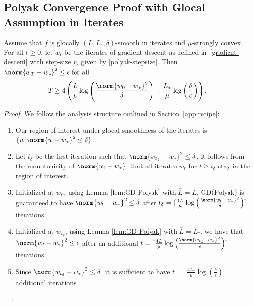 \documentclass[10pt]{article} %
\begin{document}
\subsection{Polyak Convergence Proof with Glocal Assumption in Iterates}
\label{polyak-proofs-iterates}
\begin{theorem}
    \label{polyak-theorem-iterates}
    Assume that $f$ is glocally $(L, L_*, \delta)$-smooth in iterates and $\mu$-strongly convex. For all $t \geq 0$, let $w_t$ be the iterates of gradient descent as defined in~\eqref{gradient-descent} with step-size $\eta_t$ given by \eqref{polyak-stepsize}. Then $\norm{w_T - w_*}^2 \leq \epsilon \;\text{for all}$
    \begin{equation*}        
         T \geq 
         4\left(\frac{L}{\mu}\log\left(\frac{\norm{w_0 - w_*}^2}{\delta}\right) + \frac{L_*}{\mu}\log\left(\frac{\delta}{\epsilon}\right)\right).      
    \end{equation*}
\end{theorem}
\begin{proof}
We follow the analysis structure outlined in Section~\ref{app:recipe}:
    \begin{enumerate}
    \item Our region of interest under glocal smoothness of the iterates is $\{w | \norm{w - w_*}^2 \leq \delta \}$.
    \item Let $t_\delta$ be the first iteration such that $\norm{w_{t_\delta} - w_*}^2 \leq \delta$. It follows from the monotonicity of $\norm{w_t - w_*}$, that all iterates $w_t$ for $t\geq t_\delta$ stay in the region of interest.
    \item Initialized at $w_0$, using Lemma \ref{lem:GD-Polyak} with $\bar{L} = L$, GD(Polyak) is guaranteed to have $\norm{w_{t} - w_*}^2 \leq \delta$ after $t_\delta = \lceil \frac{4L}{\mu}\log\left(\frac{\norm{w_0 - w_*}^2}{\delta}\right) \rceil$ iterations.
    \item Initialized at $w_{t_\delta}$, using Lemma \ref{lem:GD-Polyak} with $\bar{L} = L_{*}$, we have that $\norm{w_{t} - w_*}^2 \leq \epsilon$ after an additional $t = \lceil \frac{4L}{\mu}\log\left(\frac{\norm{w_{t_\delta} - w_*}^2}{\epsilon}\right) \rceil$ iterations.
    \item Since $\norm{w_{t_\delta} - w_*}^2 \leq \delta$, it is sufficient to have $t = \lceil \frac{4L_{*}}{\mu}\log\left(\frac{\delta}{\epsilon}\right) \rceil$ additional iterations.
    \end{enumerate}
\end{proof}
\fi
\end{document}
